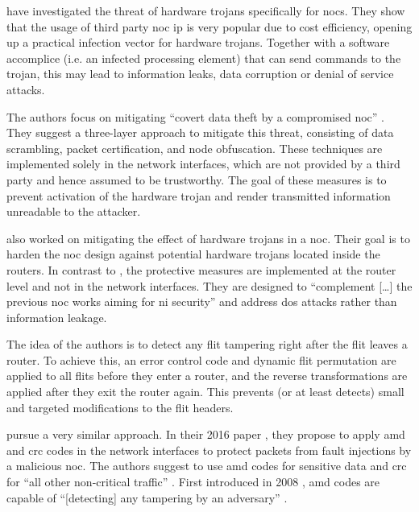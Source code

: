 \citeauthor{ancajas14fortnocs} \cite{ancajas14fortnocs} have investigated the threat of hardware trojans specifically for \glspl{noc}. They show that the usage of
third party \gls{noc} \gls{ip} is very popular due to cost efficiency, opening up a practical infection vector for hardware
trojans. Together with a software accomplice (i.e. an infected processing element) that can send commands to the trojan, this may
lead to information leaks, data corruption or denial of service attacks.

The authors focus on mitigating \enquote{covert data theft by a compromised \gls{noc}} \cite[3]{ancajas14fortnocs}. They suggest a three-layer
approach to mitigate this threat, consisting of data scrambling, packet certification, and node obfuscation. These techniques are
implemented solely in the network interfaces, which are not provided by a third party and hence assumed to be trustworthy. The goal of these measures
is to prevent activation of the hardware trojan and render transmitted information unreadable to the attacker.

\citeauthor{frey17hardenednoc} \cite{frey17hardenednoc} also worked on mitigating the effect of hardware trojans in a \gls{noc}. Their goal is to
harden the \gls{noc} design against potential hardware trojans located inside the routers. In contrast to \citeauthor{ancajas14fortnocs}
\cite{ancajas14fortnocs}, the protective measures are implemented at the router level and not in the network interfaces. They are designed to
\enquote{complement […] the previous \gls{noc} works aiming for \gls{ni} security} \cite[16]{frey17hardenednoc} and address \gls{dos} attacks rather
than information leakage.

The idea of the authors is to detect any flit tampering right after the flit leaves a router. To achieve this, an error control code and dynamic flit
permutation are applied to all flits before they enter a router, and the reverse transformations are applied after they exit the router again. This
prevents (or at least detects) small and targeted modifications to the flit headers. %

\citeauthor{boraten16packetsecurity} pursue a very similar approach. In their 2016 paper \cite{boraten16packetsecurity}, they propose to apply
\gls{amd} and \gls{crc} codes in the network interfaces to protect packets from fault injections by a malicious \gls{noc}. The authors suggest to use
\gls{amd} codes for sensitive data and \gls{crc} for \enquote{all other non-critical traffic} \cite[2]{boraten16packetsecurity}. First introduced in 2008
\cite{cramer08amdcodes}, \gls{amd} codes are capable of \enquote{[detecting] any tampering by an adversary} \cite[1]{cramer08amdcodes}.

